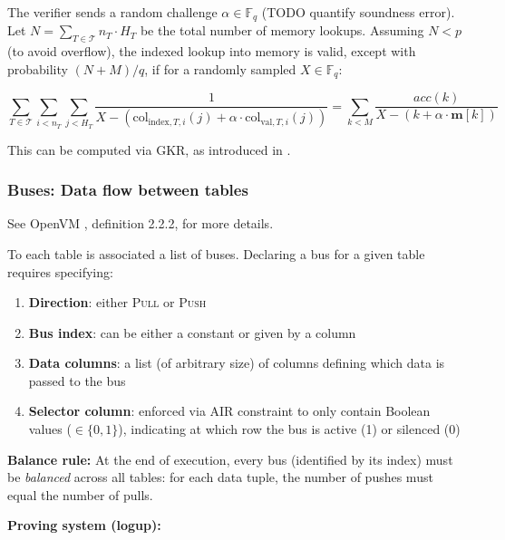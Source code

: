 \documentclass{article}
\theoremstyle{definition}
\newcommand{\Fq}{\mathbb F_q}
\begin{document}
\vspace{3mm}

The verifier sends a random challenge $\alpha \in \Fq$ (TODO quantify soundness error). Let $N = \sum_{T \in \mathcal{T}} n_T \cdot H_T$ be the total number of memory lookups. Assuming $N < p$ (to avoid overflow), the indexed lookup into memory is valid, except with probability $(N + M)/q$, if for a randomly sampled $X \in \Fq$:

$$\sum_{T \in \mathcal{T}} \sum_{i<n_T} \sum_{j<H_T} \frac{1}{X - (\text{col}_{\text{index},T,i}(j) + \alpha \cdot \text{col}_{\text{val},T,i}(j))} = \sum_{k<M} \frac{\textit{acc}(k)}{X - (k + \alpha \cdot \textbf{m}[k])}$$

This can be computed via GKR, as introduced in \cite{logup_gkr}.

\subsubsection{Buses: Data flow between tables}

See OpenVM \cite{openvm}, definition 2.2.2, for more details.

To each table is associated a list of buses. Declaring a bus for a given table requires specifying:

\begin{enumerate}
    \item \textbf{Direction}: either \textsc{Pull} or \textsc{Push}
    \item \textbf{Bus index}: can be either a constant or given by a column
    \item \textbf{Data columns}: a list (of arbitrary size) of columns defining which data is passed to the bus
    \item \textbf{Selector column}: enforced via AIR constraint to only contain Boolean values ($\in \{0, 1\}$), indicating at which row the bus is active (1) or silenced (0)
\end{enumerate}

\vspace{3mm}

\textbf{Balance rule:} At the end of execution, every bus (identified by its index) must be \textit{balanced} across all tables: for each data tuple, the number of pushes must equal the number of pulls.

\vspace{5mm}

\textbf{Proving system (logup):}
\end{document}
